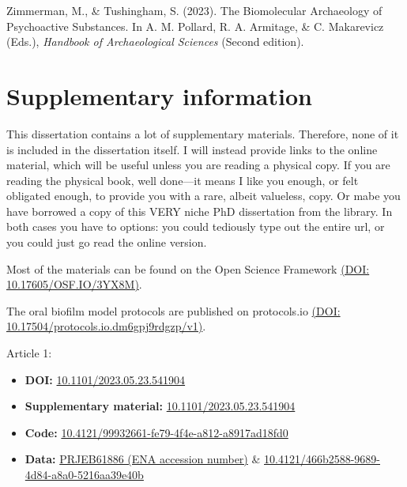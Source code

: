 \documentclass[
  b5paper,
]{book}
\providecommand{\tightlist}{%
  \setlength{\itemsep}{0pt}\setlength{\parskip}{0pt}}
\newlength{\cslhangindent}
\newlength{\cslentryspacingunit} %
\newenvironment{CSLReferences}[2] %
 {%
  \setlength{\parindent}{0pt}
  \ifodd #1
  \let\oldpar\par
  \def\par{\hangindent=\cslhangindent\oldpar}
  \fi
  \setlength{\parskip}{#2\cslentryspacingunit}
 }%
 {}
\begin{document}
\begin{CSLReferences}{1}{0}
\leavevmode{}%
Zimmerman, M., \& Tushingham, S. (2023). The {Biomolecular Archaeology}
of {Psychoactive Substances}. In A. M. Pollard, R. A. Armitage, \& C.
Makarevicz (Eds.), \emph{Handbook of {Archaeological Sciences}} (Second
edition).

\end{CSLReferences}

\hypertarget{supplementary-information}{%
\chapter*{Supplementary information}\label{supplementary-information}}


This dissertation contains a lot of supplementary materials. Therefore,
none of it is included in the dissertation itself. I will instead
provide links to the online material, which will be useful unless you
are reading a physical copy. If you are reading the physical book, well
done---it means I like you enough, or felt obligated enough, to provide
you with a rare, albeit valueless, copy. Or mabe you have borrowed a
copy of this VERY niche PhD dissertation from the library. In both cases
you have to options: you could tediously type out the entire url, or you
could just go read the online version.

Most of the materials can be found on the Open Science Framework
\href{https://doi.org/10.17605/OSF.IO/3YX8M}{(DOI:
10.17605/OSF.IO/3YX8M)}.

The oral biofilm model protocols are published on protocols.io
\href{https://dx.doi.org/10.17504/protocols.io.dm6gpj9rdgzp/v1}{(DOI:
10.17504/protocols.io.dm6gpj9rdgzp/v1)}.

Article 1:

\begin{itemize}
\tightlist
\item
  \textbf{DOI:}
  \href{https://doi.org/10.1101/2023.05.23.541904}{10.1101/2023.05.23.541904}
\item
  \textbf{Supplementary material:}
  \href{https://doi.org/10.1101/2023.05.23.541904}{10.1101/2023.05.23.541904}
\item
  \textbf{Code:}
  \href{https://doi.org/10.4121/99932661-fe79-4f4e-a812-a8917ad18fd0}{10.4121/99932661-fe79-4f4e-a812-a8917ad18fd0}
\item
  \textbf{Data:}
  \href{https://www.ebi.ac.uk/ena/browser/view/PRJEB61886}{PRJEB61886
  (ENA accession number)} \&
  \href{https://doi.org/10.4121/466b2588-9689-4d84-a8a0-5216aa39e40b}{10.4121/466b2588-9689-4d84-a8a0-5216aa39e40b}
\end{itemize}
\end{document}
